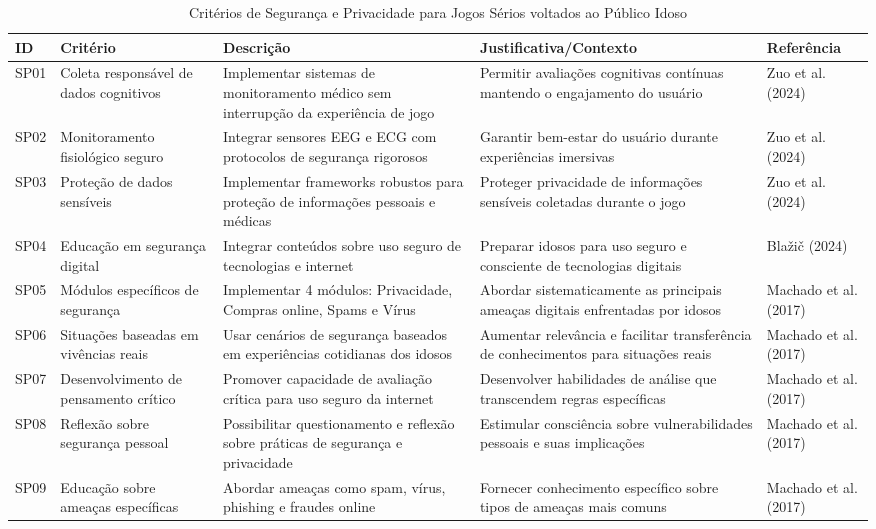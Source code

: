 \begin{table}[H]
\begin{table}[H]
\centering
\caption{Critérios de Segurança e Privacidade para Jogos Sérios voltados ao Público Idoso}
\label{tab:seguranca_privacidade}
\begin{tabular}{p{0.5cm}p{3cm}p{4cm}p{4cm}p{2.5cm}}
\hline
\textbf{ID} & \textbf{Critério} & \textbf{Descrição} & \textbf{Justificativa/Contexto} & \textbf{Referência} \\ \hline
SP01 & Coleta responsável de dados cognitivos & Implementar sistemas de monitoramento médico sem interrupção da experiência de jogo & Permitir avaliações cognitivas contínuas mantendo o engajamento do usuário & Zuo et al. (2024) \\
SP02 & Monitoramento fisiológico seguro & Integrar sensores EEG e ECG com protocolos de segurança rigorosos & Garantir bem-estar do usuário durante experiências imersivas & Zuo et al. (2024) \\
SP03 & Proteção de dados sensíveis & Implementar frameworks robustos para proteção de informações pessoais e médicas & Proteger privacidade de informações sensíveis coletadas durante o jogo & Zuo et al. (2024) \\
SP04 & Educação em segurança digital & Integrar conteúdos sobre uso seguro de tecnologias e internet & Preparar idosos para uso seguro e consciente de tecnologias digitais & Blažič (2024) \\
SP05 & Módulos específicos de segurança & Implementar 4 módulos: Privacidade, Compras online, Spams e Vírus & Abordar sistematicamente as principais ameaças digitais enfrentadas por idosos & Machado et al. (2017) \\
SP06 & Situações baseadas em vivências reais & Usar cenários de segurança baseados em experiências cotidianas dos idosos & Aumentar relevância e facilitar transferência de conhecimentos para situações reais & Machado et al. (2017) \\
SP07 & Desenvolvimento de pensamento crítico & Promover capacidade de avaliação crítica para uso seguro da internet & Desenvolver habilidades de análise que transcendem regras específicas & Machado et al. (2017) \\
SP08 & Reflexão sobre segurança pessoal & Possibilitar questionamento e reflexão sobre práticas de segurança e privacidade & Estimular consciência sobre vulnerabilidades pessoais e suas implicações & Machado et al. (2017) \\
SP09 & Educação sobre ameaças específicas & Abordar ameaças como spam, vírus, phishing e fraudes online & Fornecer conhecimento específico sobre tipos de ameaças mais comuns & Machado et al. (2017) \\

\end{tabular}
\end{table}
\end{table}
